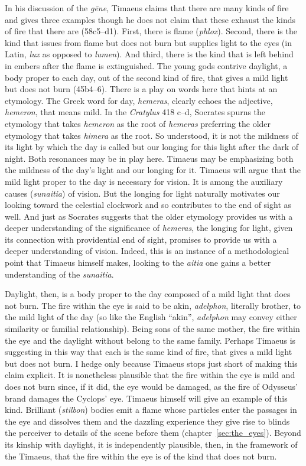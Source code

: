 In his discussion of the \emph{gēne}, Timaeus claims that there are many kinds of fire and gives three examples though he does not claim that these exhaust the kinds of fire that there are (58c5–d1). First, there is flame (\emph{phlox}). Second, there is the kind that issues from flame but does not burn but supplies light to the eyes (in Latin, \emph{lux} as opposed to \emph{lumen}). And third, there is the kind that is left behind in embers after the flame is extinguished. The young gods contrive daylight, a body proper to each day, out of the second kind of fire, that gives a mild light but does not burn (45b4--6). There is a play on words here that hints at an etymology. The Greek word for day, \emph{hemeras}, clearly echoes the adjective, \emph{hemeron}, that means mild. In the \emph{Cratylus} 418 c--d, Socrates spurns the etymology that takes \emph{hemeron} as the root of \emph{hemeras} preferring the older etymology that takes \emph{himera} as the root. So understood, it is not the mildness of its light by which the day is called but our longing for this light after the dark of night. Both resonances may be in play here. Timaeus may be emphasizing both the mildness of the day's light and our longing for it. Timaeus will argue that the mild light proper to the day is necessary for vision. It is among the auxiliary causes (\emph{sunaitia}) of vision. But the longing for light naturally motivates our looking toward the celestial clockwork and so contributes to the end of sight as well. And just as Socrates suggests that the older etymology provides us with a deeper understanding of the significance of \emph{hemeras}, the longing for light, given its connection with providential end of sight, promises to provide us with a deeper understanding of vision. Indeed, this is an instance of a methodological point that Timaeus himself makes, looking to the \emph{aitia} one gains a better understanding of the \emph{sunaitia}.

Daylight, then, is a body proper to the day composed of a mild light that does not burn. The fire within the eye is said to be akin, \emph{adelphon}, literally brother, to the mild light of the day (so like the English ``akin'', \emph{adelphon} may convey either similarity or familial relationship). Being sons of the same mother, the fire within the eye and the daylight without belong to the same family. Perhaps Timaeus is suggesting in this way that each is the same kind of fire, that gives a mild light but does not burn. I hedge only because Timaeus stops just short of making this claim explicit. It is nonetheless plausible that the fire within the eye is mild and does not burn since, if it did, the eye would be damaged, as the fire of Odysseus' brand damages the Cyclops' eye. Timaeus himself will give an example of this kind. Brilliant (\emph{stilbon}) bodies emit a flame whose particles enter the passages in the eye and dissolves them and the dazzling experience they give rise to blinds the perceiver to details of the scene before them (chapter~\ref{sec:the_eyes}). Beyond its kinship with daylight, it is independently plausible, then, in the framework of the Timaeus, that the fire within the eye is of the kind that does not burn.

